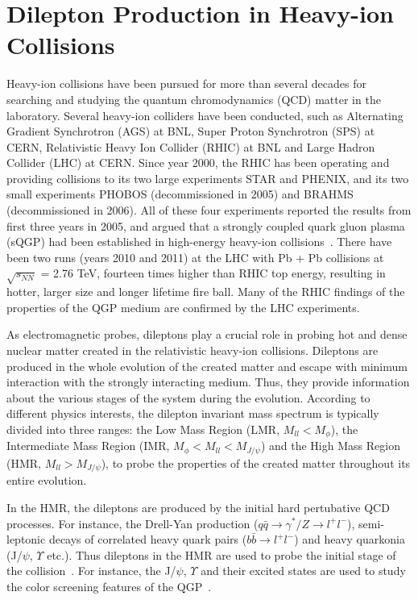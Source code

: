\section{Dilepton Production in Heavy-ion Collisions}
\label{dilepton:physics}
Heavy-ion collisions have been pursued for more than several decades for searching and studying the quantum chromodynamics (QCD) matter in the laboratory. Several heavy-ion colliders have been conducted, such as Alternating Gradient Synchrotron (AGS) at BNL, Super Proton Synchrotron (SPS) at CERN, Relativistic Heavy Ion Collider (RHIC) at BNL and Large Hadron Collider (LHC) at CERN. Since year 2000, the RHIC has been operating and providing collisions to its two large experiments STAR and PHENIX, and its two small experiments PHOBOS (decommissioned in 2005) and BRAHMS (decommissioned in 2006). All of these four experiments reported the results from first three years in 2005, and argued that a strongly coupled quark gluon plasma (sQGP) had been established in high-energy heavy-ion collisions~\cite{STARwp,PHENIXwp,PHOBOSwp,BRAHMSwp}. There have been two runs (years 2010 and 2011) at the LHC with Pb + Pb collisions at $\sqrt{s_{NN}}$ = 2.76 TeV, fourteen times higher than RHIC top energy, resulting in hotter, larger size and longer lifetime fire ball. Many of the RHIC findings of the properties of the QGP medium are confirmed by the LHC experiments.

As electromagnetic probes, dileptons play a crucial role in probing hot and dense nuclear matter created in the relativistic heavy-ion collisions. Dileptons are produced in the whole evolution of the created matter and escape with minimum interaction with the strongly interacting medium. Thus, they provide information about the various stages of the system during the evolution. According to different physics interests, the dilepton invariant mass spectrum is typically divided into three ranges: the Low Mass Region (LMR, $M_{ll}<M_{\phi}$), the Intermediate Mass Region (IMR, $M_{\phi}<M_{ll}<M_{J/\psi}$) and the High Mass Region (HMR, $M_{ll}>M_{J/\psi}$), to probe the properties of the created matter throughout its entire evolution.

In the HMR, the dileptons are produced by the initial hard pertubative QCD processes. For instance, the Drell-Yan production ($q\bar{q} \rightarrow \gamma^{*}/Z \rightarrow l^{+}l^{-}$), semi-leptonic decays of correlated heavy quark pairs ($b\bar{b} \rightarrow l^{+}l^{-}$) and heavy quarkonia (J/$\psi$, $\varUpsilon$ etc.). Thus dileptons in the HMR are used to probe the initial stage of the collision~\cite{InitialDilepton}. For instance, the J/$\psi$, $\varUpsilon$ and their excited states are used to study the color screening features of the QGP~\cite{JpsiDeconfinement}.

